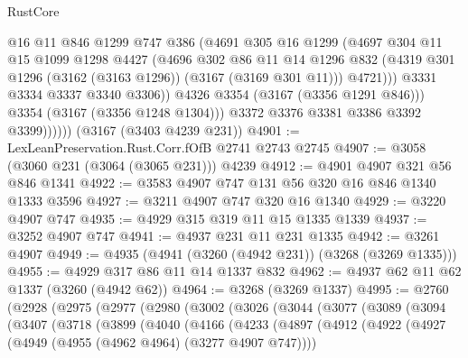 \begin{lexlean}{RustCore}
\begin{coremodule}
                        @16
                        @11
                        @846
                        @1299
                        @747
                        @386
                        (@4691
                          @305
                          @16
                          @1299
                          (@4697
                            @304
                            @11
                            @15
                            @1099
                            @1298
                            @4427
                            (@4696
                              @302
                              @86
                              @11
                              @14
                              @1296
                              @832
                              (@4319 @301 @1296 (@3162 (@3163 @1296)) (@3167 (@3169 @301 @11)))
                              @4721)))
                        @3331
                        @3334
                        @3337
                        @3340
                        @3306))
                    @4326
                    @3354
                    (@3167 (@3356 @1291 @846)))
                  @3354
                  (@3167 (@3356 @1248 @1304)))
                @3372
                @3376
                @3381
                @3386
                @3392
                @3399))))))
    (@3167 (@3403 @4239 @231))
@4901 := LexLeanPreservation.Rust.Corr.fOfB @2741 @2743 @2745
@4907 := @3058 (@3060 @231 (@3064 (@3065 @231))) @4239
@4912 := @4901 @4907 @321 @56 @846 @1341
@4922 := @3583 @4907 @747 @131 @56 @320 @16 @846 @1340 @1333 @3596
@4927 := @3211 @4907 @747 @320 @16 @1340
@4929 := @3220 @4907 @747
@4935 := @4929 @315 @319 @11 @15 @1335 @1339
@4937 := @3252 @4907 @747
@4941 := @4937 @231 @11 @231 @1335
@4942 := @3261 @4907
@4949 := @4935 (@4941 (@3260 (@4942 @231)) (@3268 (@3269 @1335)))
@4955 := @4929 @317 @86 @11 @14 @1337 @832
@4962 := @4937 @62 @11 @62 @1337 (@3260 (@4942 @62))
@4964 := @3268 (@3269 @1337)
@4995 := @2760
    (@2928
      (@2975
        (@2977
          (@2980
            (@3002
              (@3026
                (@3044
                  (@3077
                    (@3089
                      (@3094
                        (@3407
                          (@3718
                            (@3899
                              (@4040
                                (@4166
                                  (@4233
                                    (@4897
                                      (@4912
                                        (@4922
                                          (@4927 (@4949 (@4955 (@4962 @4964) (@3277 @4907 @747))))

\end{coremodule}
\end{lexlean}
